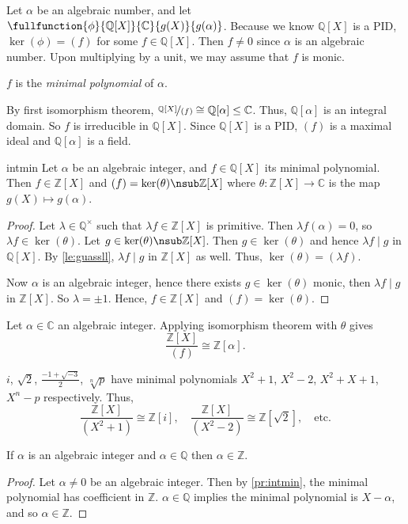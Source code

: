 Let \(\alpha\) be an algebraic number, and let \(\fullfunction{\phi}{\mathbb{Q}[X]}{\mathbb{C}}{g(X)}{g(\alpha)}\). Because we know \(\mathbb{Q}[X]\) is a PID, \(\ker(\phi) = (f)\) for some \(f \in \mathbb{Q}[X]\). Then \(f \neq 0\) since \(\alpha\) is an algebraic number. Upon multiplying by a unit, we may assume that \(f\) is monic.
\begin{definition}{}{}
    \(f\) is the \textit{minimal polynomial} of \(\alpha\).
\end{definition}
By first isomorphism theorem, \(\nicefrac{\mathbb{Q}[X]}{(f)}\cong \mathbb{Q}[\alpha] \leq \mathbb{C}\). Thus, \(\mathbb{Q}[\alpha]\) is an integral domain. So \(f\) is irreducible in \(\mathbb{Q}[X]\). Since \(\mathbb{Q}[X]\) is a PID, \((f)\) is a maximal ideal and \(\mathbb{Q}[\alpha]\) is a field.

\begin{proposition}{}{intmin}
    Let \(\alpha\) be an algebraic integer, and \(f \in \mathbb{Q}[X]\) its minimal polynomial. Then \(f \in \mathbb{Z}[X]\) and \((f) = \ker(\theta)\nsub \mathbb{Z}[X]\) where \(\theta: \mathbb{Z}[X] \to \mathbb{C}\) is the map \(g(X) \mapsto g(\alpha)\).
\end{proposition}
\begin{proof}
    Let \(\lambda \in \mathbb{Q}^\times\) such that \(\lambda f \in \mathbb{Z}[X]\) is primitive. Then \(\lambda f(\alpha) = 0\), so \(\lambda f \in \ker(\theta)\). Let \(g \in \ker(\theta) \nsub \mathbb{Z}[X]\). Then \(g \in \ker(\theta)\) and hence \(\lambda f \mid g\) in \(\mathbb{Q}[X]\). By \cref{le:guassll}, \(\lambda f \mid g\) in \(\mathbb{Z}[X]\) as well. Thus, \(\ker(\theta) = (\lambda f)\).

    Now \(\alpha\) is an algebraic integer, hence there exists \(g \in \ker(\theta)\) monic, then \(\lambda f \mid g\) in \(\mathbb{Z}[X]\). So \(\lambda = \pm 1\). Hence, \(f \in \mathbb{Z}[X]\) and \((f) = \ker(\theta)\).
\end{proof}
Let \(\alpha \in \mathbb{C}\) an algebraic integer. Applying isomorphism theorem with \(\theta\) gives
\[
    \frac{\mathbb{Z}[X]}{(f)} \cong \mathbb{Z}[\alpha].
\]
\begin{example}
    \(i\), \(\sqrt{2}\), \(\frac{-1 + \sqrt{-3}}{2}\), \(\sqrt[n]{p}\) have minimal polynomials \(X^2 + 1\), \(X^2 - 2\), \(X^2 + X + 1\), \(X^n - p\) respectively. Thus,
    \[
        \frac{\mathbb{Z}[X]}{(X^2 + 1)} \cong \mathbb{Z}[i], \quad \frac{\mathbb{Z}[X]}{(X^2 - 2)} \cong \mathbb{Z}[\sqrt{2}], \quad \text{etc.}
    \]
\end{example}
\begin{corollary}{}{}
    If \(\alpha\) is an algebraic integer and \(\alpha \in \mathbb{Q}\) then \(\alpha \in \mathbb{Z}\).
\end{corollary}
\begin{proof}
    Let \(\alpha \neq 0\) be an algebraic integer. Then by \cref{pr:intmin}, the minimal polynomial has coefficient in \(\mathbb{Z}\). \(\alpha \in \mathbb{Q}\) implies the minimal polynomial is \(X - \alpha\), and so \(\alpha \in \mathbb{Z}\).
\end{proof}
